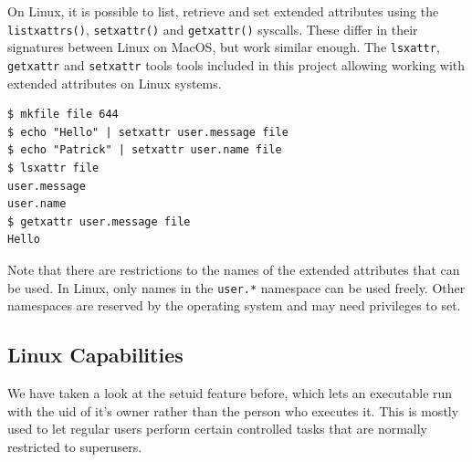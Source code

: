 \documentclass[a4paper]{article}
\begin{document}
On Linux, it is possible to list, retrieve and set extended attributes using the \verb|listxattrs()|, \verb|setxattr()| and \verb|getxattr()| syscalls. These differ in their signatures between Linux on MacOS, but work similar enough. The \verb|lsxattr|, \verb|getxattr| and \verb|setxattr| tools tools included in this project allowing working with extended attributes on Linux systems.

\begin{verbatim}
$ mkfile file 644
$ echo "Hello" | setxattr user.message file
$ echo "Patrick" | setxattr user.name file
$ lsxattr file
user.message
user.name
$ getxattr user.message file
Hello
\end{verbatim}
Note that there are restrictions to the names of the extended attributes that can be used. In Linux, only names in the \verb|user.*| namespace can be used freely. Other namespaces are reserved by the operating system and may need privileges to set. 

\subsection{Linux Capabilities}

We have taken a look at the setuid feature before, which lets an executable run with the \gls{uid} of it's owner rather than the person who executes it. This is mostly used to let regular users perform certain controlled tasks that are normally restricted to superusers.
\end{document}
